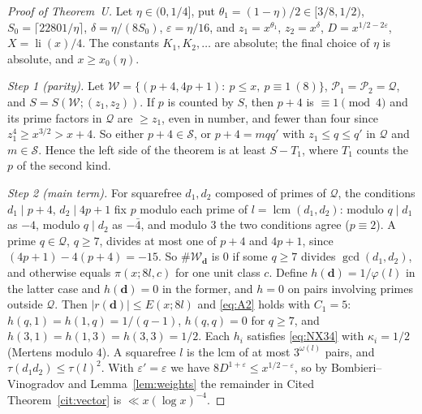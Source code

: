 \documentclass[11pt,reqno]{amsart}
\theoremstyle{definition}
\newcommand{\cS}{\mathcal S}
\newcommand{\cQ}{\mathcal Q}
\newcommand{\li}{\operatorname{li}}
\begin{document}
\begin{proof}[Proof of Theorem~U]
Let $\eta\in(0,1/4]$, put $\theta_1=(1-\eta)/2\in[3/8,1/2)$,
$S_0=\lceil 22801/\eta\rceil$, $\delta=\eta/(8S_0)$, $\varepsilon=\eta/16$,
and $z_1=x^{\theta_1}$, $z_2=x^{\delta}$, $D=x^{1/2-2\varepsilon}$,
$X=\li(x)/4$.  The constants $K_1,K_2,\dots$ are absolute; the final choice
of $\eta$ is absolute, and $x\ge x_0(\eta)$.

\emph{Step 1 (parity).}  Let $\mathcal W=\{(p+4,4p+1):\ p\le x,\
p\equiv1\ (8)\}$, $\mathcal P_1=\mathcal P_2=\cQ$, and
$S=S(\mathcal W;(z_1,z_2))$.  If $p$ is counted by $S$, then $p+4$ is
$\equiv1\pmod 4$ and its prime factors in $\cQ$ are $\ge z_1$, even in
number, and fewer than four since $z_1^4\ge x^{3/2}>x+4$.  So either
$p+4\in\cS$, or $p+4=mqq'$ with $z_1\le q\le q'$ in $\cQ$ and $m\in\cS$.
Hence the left side of the theorem is at least $S-T_1$, where $T_1$
counts the $p$ of the second kind.

\emph{Step 2 (main term).}  For squarefree $d_1,d_2$ composed of primes
of $\cQ$, the conditions $d_1\mid p+4$, $d_2\mid4p+1$ fix $p$ modulo each
prime of $l=\operatorname{lcm}(d_1,d_2)$: modulo $q\mid d_1$ as $-4$,
modulo $q\mid d_2$ as $-\bar4$, and modulo $3$ the two conditions agree
($p\equiv2$).  A prime $q\in\cQ$, $q\ge7$, divides at most one of $p+4$
and $4p+1$, since $(4p+1)-4(p+4)=-15$.  So $\#\mathcal W_{\mathbf d}$ is $0$
if some $q\ge7$ divides $\gcd(d_1,d_2)$, and otherwise equals
$\pi(x;8l,c)$ for one unit class $c$.  Define $h(\mathbf d)=1/\varphi(l)$
in the latter case and $h(\mathbf d)=0$ in the former, and $h=0$ on pairs
involving primes outside $\cQ$.  Then $|r(\mathbf d)|\le E(x;8l)$ and
\eqref{eq:A2} holds with $C_1=5$: $h(q,1)=h(1,q)=1/(q-1)$, $h(q,q)=0$ for
$q\ge7$, and $h(3,1)=h(1,3)=h(3,3)=1/2$.  Each $h_i$ satisfies
\eqref{eq:NX34} with $\kappa_i=1/2$ (Mertens modulo $4$).  A squarefree
$l$ is the lcm of at most $3^{\omega(l)}$ pairs, and
$\tau(d_1d_2)\le\tau(l)^2$.  With $\varepsilon'=\varepsilon$ we have
$8D^{1+\varepsilon}\le x^{1/2-\varepsilon}$, so by Bombieri--Vinogradov and
Lemma~\ref{lem:weights} the remainder in Cited
Theorem~\ref{cit:vector} is $\ll x(\log x)^{-4}$.


\end{proof}
\end{document}
